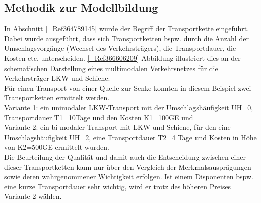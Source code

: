 % 
\subsection{Methodik zur Modellbildung}
\label{_Toc366766103}
\label{_Toc366775297}
\label{_Ref366275916}
\label{_Ref364433229}
\label{_Ref361847870}
\label{_Toc363572033}
\label{_Toc363601741}
In Abschnitt \autoref{_Ref364789145}  wurde der Begriff der Transportkette eingeführt. Dabei wurde ausgeführt, dass sich Transportketten bspw. durch die Anzahl der Umschlagsvorgänge (Wechsel des Verkehrsträgers), die Transportdauer, die Kosten etc. unterscheiden. \autoref{_Ref366606209} Abbildung  illustriert dies an der schematischen Darstellung eines multimodalen Verkehrsnetzes für die Verkehrsträger LKW und Schiene: ~\\
Für einen Transport von einer Quelle zur Senke konnten in diesem Beispiel zwei Transportketten ermittelt werden. ~\\
Variante 1: ein unimodaler LKW-Transport mit der Umschlagshäufigkeit UH=0, Transportdauer T1=10Tage und den Kosten K1=100GE und ~\\
Variante 2: ein bi-modaler Transport mit LKW und Schiene, für den eine Umschlagshäufigkeit UH=2, eine Transportdauer T2=4 Tage und Kosten in Höhe von K2=500GE ermittelt wurden. ~\\
Die Beurteilung der Qualität und damit auch die Entscheidung zwischen einer dieser Transportketten kann nur über den Vergleich der Merkmalsausprägungen sowie deren wahrgenommener Wichtigkeit erfolgen. Ist einem Disponenten bspw. eine kurze Transportdauer sehr wichtig, wird er trotz des höheren Preises Variante 2 wählen.~\\

